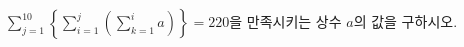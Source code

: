 $\displaystyle\sum_{j=1}^{10}\left\{\sum_{i=1}^{j}\left(\sum_{k=1}^{i} a\right)\right\}=220$을 만족시키는 상수 $a$의 값을 구하시오.
